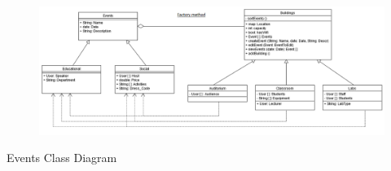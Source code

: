\documentclass{article}
\begin{document}
    \mbox{}\\
    \bigskip
    \clearpage
    
    \begin{figure}[h!]
      \includegraphics[width=\textwidth]{Images/ClassDiagramEvents.png}
    \end{figure}
    Events Class Diagram
    
\end{document}
